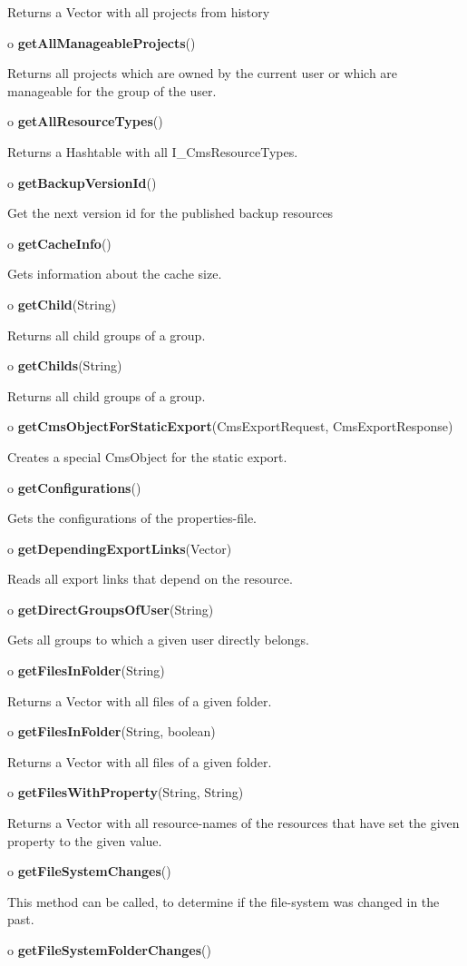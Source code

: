 \begin{description}
Returns a Vector with all projects from history  
\item o {\bf getAllManageableProjects}()  

Returns all projects which are owned by the current user or which are
manageable for the group of the user.  
\item o {\bf getAllResourceTypes}()  

Returns a Hashtable with all I\_CmsResourceTypes.  
\item o {\bf getBackupVersionId}()  

Get the next version id for the published backup resources  
\item o {\bf getCacheInfo}()  

Gets information about the cache size.  
\item o {\bf getChild}(String)  

Returns all child groups of a group.  
\item o {\bf getChilds}(String)  

Returns all child groups of a group.  
\item o {\bf getCmsObjectForStaticExport}(CmsExportRequest, CmsExportResponse)
 

Creates a special CmsObject for the static export.  
\item o {\bf getConfigurations}()  

Gets the configurations of the properties-file.  
\item o {\bf getDependingExportLinks}(Vector)  

Reads all export links that depend on the resource.  
\item o {\bf getDirectGroupsOfUser}(String)  

Gets all groups to which a given user directly belongs.  
\item o {\bf getFilesInFolder}(String)  

Returns a Vector with all files of a given folder.  
\item o {\bf getFilesInFolder}(String, boolean)  

Returns a Vector with all files of a given folder.  
\item o {\bf getFilesWithProperty}(String, String)  

Returns a Vector with all resource-names of the resources that have set the
given property to the given value.  
\item o {\bf getFileSystemChanges}()  

This method can be called, to determine if the file-system was changed in the
past.  
\item o {\bf getFileSystemFolderChanges}()  


\end{description}
